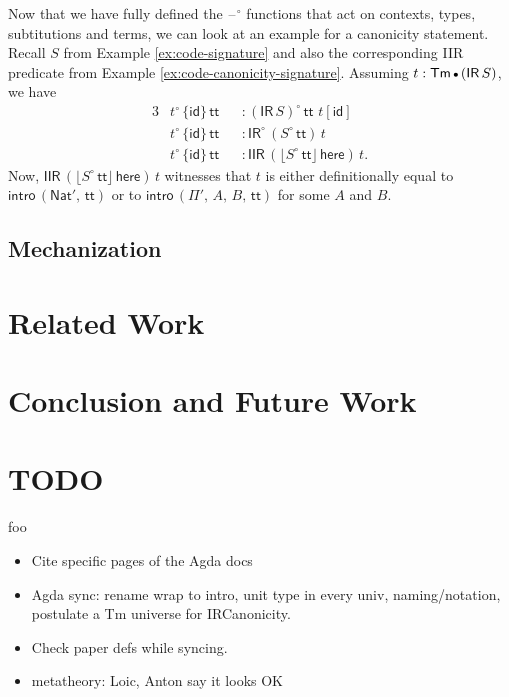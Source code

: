 \documentclass[acmsmall,screen,review,anonymous]{acmart}
\newcommand{\msf}[1]{{\mathsf{#1}}}
\newcommand{\Nat}{\msf{Nat}}
\newcommand{\ttt}{\msf{tt}}
\newcommand{\blank}{{\mathord{\hspace{1pt}\text{--}\hspace{1pt}}}}
\newcommand{\IR}{\msf{IR}}
\newcommand{\intro}{\msf{intro}}
\newcommand{\IIR}{\msf{IIR}}
\newcommand{\floord}[1]{\lfloor #1 \rfloor}
\newcommand{\emptycon}{\scaleobj{.75}\bullet}
\newcommand{\id}{\msf{id}}
\newcommand{\Tm}{\msf{Tm}}
\newcommand{\w}{\circ}
\newcommand{\here}{\msf{here}}
\begin{document}
\begin{example}
Now that we have fully defined the $\blank^\w$ functions that act on contexts, types, subtitutions and
terms, we can look at an example for a canonicity statement. Recall $S$ from Example \ref{ex:code-signature} and
also the corresponding IIR predicate from Example \ref{ex:code-canonicity-signature}. Assuming $t :
\Tm\,\emptycon\,(\IR\,S)$, we have
\begin{alignat*}{3}
  &t^\w\,\{\id\}\,\ttt &&: (\IR\,S)^\w\,\ttt\,\,t[\id]\\
  &t^\w\,\{\id\}\,\ttt &&: \IR^\w\,(S^\w\,\ttt)\,t\\
  &t^\w\,\{\id\}\,\ttt &&: \IIR\,(\floord{S^\w\,\ttt}\,\here)\,t.
\end{alignat*}
Now, $\IIR\,(\floord{S^\w\,\ttt}\,\here)\,t$ witnesses that $t$ is either definitionally equal to $\intro\,(\Nat',\,\ttt)$
or to $\intro\,(\Pi',\,A,\,B,\,\ttt)$ for some $A$ and $B$.
\end{example}

\subsection{Mechanization}

\section{Related Work}

\section{Conclusion and Future Work}


\section{TODO}

foo


\begin{itemize}
  \item Cite specific pages of the Agda docs
  \item Agda sync: rename wrap to intro, unit type in every univ, naming/notation, postulate a Tm universe for IRCanonicity.
  \item Check paper defs while syncing.
  \item metatheory: Loic, Anton say it looks OK
\end{itemize}



\end{document}
